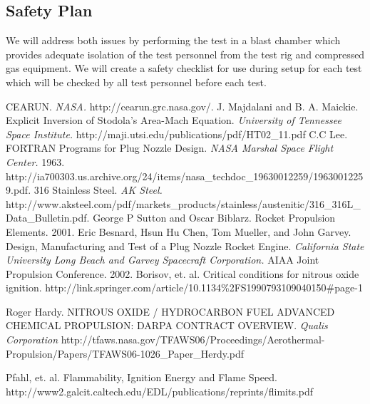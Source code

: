 \documentclass{article}
\begin{document}
\subsection*{Safety Plan}
We will address both issues by performing the test in a blast chamber which provides adequate isolation of the test personnel from the test rig and compressed gas equipment. We will create a safety checklist for use during setup for each test which will be checked by all test personnel before each test.
\begin{thebibliography}{9}
	 CEARUN. \emph{NASA.} http://cearun.grc.nasa.gov/.
	 J. Majdalani and B. A. Maickie. Explicit Inversion of Stodola's Area-Mach Equation. \emph{University of Tennessee Space Institute.} http://maji.utsi.edu/publications/pdf/HT02\_11.pdf
	 C.C Lee. FORTRAN Programs for Plug Nozzle Design. \emph{NASA Marshal Space Flight Center.} 1963. http://ia700303.us.archive.org/24/items/nasa\_techdoc\_19630012259/19630012259.pdf.
	 316 Stainless Steel. \emph{AK Steel.} http://www.aksteel.com/pdf/markets\_products/stainless/austenitic/316\_316L\_Data\_Bulletin.pdf.
	 George P Sutton and Oscar Biblarz. Rocket Propulsion Elements. 2001.
	 Eric Besnard, Hsun Hu Chen, Tom Mueller, and John Garvey. Design, Manufacturing and Test of a Plug Nozzle Rocket Engine. \emph{California State University Long Beach and Garvey Spacecraft Corporation.} AIAA Joint Propulsion Conference. 2002.
	 Borisov, et. al. Critical conditions for nitrous oxide ignition. http://link.springer.com/article/10.1134\%2FS1990793109040150\#page-1
	
	 Roger Hardy. NITROUS OXIDE / HYDROCARBON FUEL ADVANCED CHEMICAL PROPULSION: DARPA CONTRACT OVERVIEW. \emph{Qualis Corporation}  http://tfaws.nasa.gov/TFAWS06/Proceedings/Aerothermal-Propulsion/Papers/TFAWS06-1026\_Paper\_Herdy.pdf
	
	 Pfahl, et. al. Flammability, Ignition Energy and Flame Speed. http://www2.galcit.caltech.edu/EDL/publications/reprints/flimits.pdf
\end{thebibliography}
\end{document}
